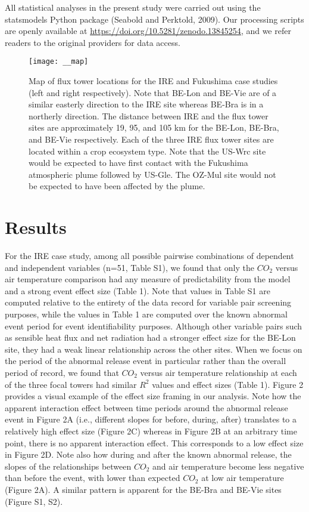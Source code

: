 \documentclass{article}
\begin{document}
All statistical analyses in the present study were carried out using the statsmodels Python package (Seabold and Perktold, 2009). Our processing scripts are openly available at \href{https://doi.org/10.5281/zenodo.13845254}{https://doi.org/10.5281/zenodo.13845254}, and we refer readers to the original providers for data access.

\begin{figure}
	\centering
	\texttt{[image: \_\_map]}
	\caption{Map of flux tower locations for the IRE and Fukushima case studies (left and right respectively). Note that BE-Lon and BE-Vie are of a similar easterly direction to the IRE site whereas BE-Bra is in a northerly direction. The distance between IRE and the flux tower sites are approximately 19, 95, and 105 km for the BE-Lon, BE-Bra, and BE-Vie respectively. Each of the three IRE flux tower sites are located within a crop ecosystem type. Note that the US-Wrc site would be expected to have first contact with the Fukushima atmospheric plume followed by US-Gle. The OZ-Mul site would not be expected to have been affected by the plume.}
	\label{fig:study_site}
\end{figure}

\section{Results}

For the IRE case study, among all possible pairwise combinations of dependent and independent variables (n=51, Table S1), we found that only the $CO_2$ versus air temperature comparison had any measure of predictability from the model and a strong event effect size (Table 1). Note that values in Table S1 are computed relative to the entirety of the data record for variable pair screening purposes, while the values in Table 1 are computed over the known abnormal event period for event identifiability purposes. Although other variable pairs such as sensible heat flux and net radiation had a stronger effect size for the BE-Lon site, they had a weak linear relationship across the other sites. When we focus on the period of the abnormal release event in particular rather than the overall period of record, we found that $CO_2$ versus air temperature relationship at each of the three focal towers had similar $R^2$ values and effect sizes (Table 1). Figure 2 provides a visual example of the effect size framing in our analysis. Note how the apparent interaction effect between time periods around the abnormal release event in Figure 2A (i.e., different slopes for before, during, after) translates to a relatively high effect size (Figure 2C) whereas in Figure 2B at an arbitrary time point, there is no apparent interaction effect. This corresponds to a low effect size in Figure 2D. Note also how during and after the known abnormal release, the slopes of the relationships between $CO_2$ and air temperature become less negative than before the event, with lower than expected $CO_2$ at low air temperature (Figure 2A). A similar pattern is apparent for the BE-Bra and BE-Vie sites (Figure S1, S2).
\end{document}
